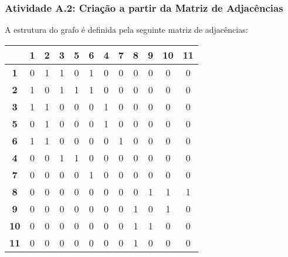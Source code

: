\documentclass[a4paper,12pt]{article}
\begin{document}
\subsubsection*{Atividade A.2: Criação a partir da Matriz de Adjacências}
A estrutura do grafo é definida pela seguinte matriz de adjacências:
\begin{center}
\scriptsize
\begin{tabular*}{\textwidth}{c|@{\extracolsep{\fill}}ccccccccccc}
\rowcolor[gray]{0.9}
 & \textbf{1} & \textbf{2} & \textbf{3} & \textbf{5} & \textbf{6} & \textbf{4} & \textbf{7} & \textbf{8} & \textbf{9} & \textbf{10} & \textbf{11} \\
\hline
\textbf{1} & 0 & 1 & 1 & 0 & 1 & 0 & 0 & 0 & 0 & 0 & 0 \\
\textbf{2} & 1 & 0 & 1 & 1 & 1 & 0 & 0 & 0 & 0 & 0 & 0 \\
\textbf{3} & 1 & 1 & 0 & 0 & 0 & 1 & 0 & 0 & 0 & 0 & 0 \\
\textbf{5} & 0 & 1 & 0 & 0 & 0 & 1 & 0 & 0 & 0 & 0 & 0 \\
\textbf{6} & 1 & 1 & 0 & 0 & 0 & 0 & 1 & 0 & 0 & 0 & 0 \\
\textbf{4} & 0 & 0 & 1 & 1 & 0 & 0 & 0 & 0 & 0 & 0 & 0 \\
\textbf{7} & 0 & 0 & 0 & 0 & 1 & 0 & 0 & 0 & 0 & 0 & 0 \\
\textbf{8} & 0 & 0 & 0 & 0 & 0 & 0 & 0 & 0 & 1 & 1 & 1 \\
\textbf{9} & 0 & 0 & 0 & 0 & 0 & 0 & 0 & 1 & 0 & 1 & 0 \\
\textbf{10} & 0 & 0 & 0 & 0 & 0 & 0 & 0 & 1 & 1 & 0 & 0 \\
\textbf{11} & 0 & 0 & 0 & 0 & 0 & 0 & 0 & 1 & 0 & 0 & 0 \\
\end{tabular*}
\end{center}
\end{document}
